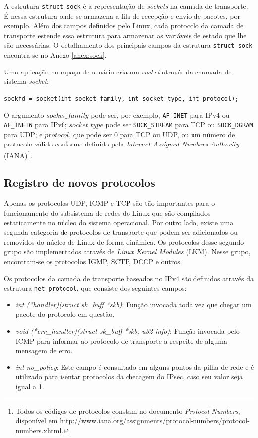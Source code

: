 A estrutura \lstinline|struct sock| é a representação de \textit{sockets} na camada de transporte. 
É nessa estrutura onde se armazena a fila de recepção e envio de pacotes, por exemplo.
Além dos campos definidos pelo Linux, cada protocolo da camada de transporte estende essa estrutura para armazenar as variáveis de estado que lhe são necessárias.
O detalhamento dos principais campos da estrutura \lstinline|struct sock| encontra-se no Anexo \ref{anex:sock}.

Uma aplicação no espaço de usuário cria um \textit{socket} através da chamada de sistema \textit{socket}:

\lstinline|sockfd = socket(int socket_family, int socket_type, int protocol);|

O argumento $socket\_family$ pode ser, por exemplo, \lstinline|AF_INET| para IPv4 ou \lstinline|AF_INET6| para IPv6; $socket\_type$ pode ser \lstinline|SOCK_STREAM| para TCP ou \lstinline|SOCK_DGRAM| para UDP; e $protocol$, que pode ser 0 para TCP ou UDP, ou um número de protocolo válido conforme definido pela \textit{Internet Assigned Numbers Authority} (IANA)\footnote{Todos os códigos de protocolos constam no documento \textit{Protocol Numbers}, disponível em \url{http://www.iana.org/assignments/protocol-numbers/protocol-numbers.xhtml}.}.

\subsection{Registro de novos protocolos}

Apenas os protocolos UDP, ICMP e TCP são tão importantes para o funcionamento do subsistema de redes do Linux que são compilados estaticamente no núcleo do sistema operacional. 
Por outro lado, existe uma segunda categoria de protocolos de transporte que podem ser adicionados ou removidos do núcleo de Linux de forma dinâmica. Os protocolos desse segundo grupo são implementados através de \textit{Linux Kernel Modules} (LKM). Nesse grupo, encontram-se os protocolos IGMP, SCTP, DCCP e outros.

Os protocolos da camada de transporte baseados no IPv4 são definidos através da estrutura \lstinline|net_protocol|, que consiste dos seguintes campos:
\begin{itemize}
\item \textit{int (*handler)(struct sk\_buff *skb)}: Função invocada toda vez que chegar um pacote do protocolo em questão.
\item \textit{void (*err\_handler)(struct sk\_buff *skb, u32 info)}: Função invocada pelo ICMP para informar ao protocolo de transporte a respeito de alguma mensagem de erro.
\item \textit{int no\_policy}: Este campo é consultado em alguns pontos da pilha de rede e é utilizado para isentar protocolos da checagem do IPsec, caso seu valor seja igual a 1.
\end{itemize}

